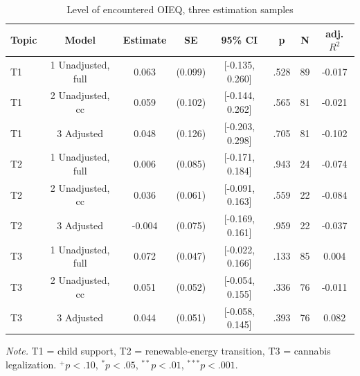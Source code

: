 \begin{table}[htbp]
\centering
\begin{threeparttable}
\caption{Level of encountered OIEQ, three estimation samples}
\label{tab:tab_q_level}
\begin{tabular}{lccccccc}
\toprule
  Topic & Model & Estimate & SE & 95\% CI & p & N & adj. $R^2$ \\
\midrule
  T1 & 1 Unadjusted, full & 0.063 & (0.099) & [-0.135, 0.260] & .528 & 89 & -0.017 \\
  T1 & 2 Unadjusted, cc & 0.059 & (0.102) & [-0.144, 0.262] & .565 & 81 & -0.021 \\
  T1 & 3 Adjusted & 0.048 & (0.126) & [-0.203, 0.298] & .705 & 81 & -0.102 \\
  T2 & 1 Unadjusted, full & 0.006 & (0.085) & [-0.171, 0.184] & .943 & 24 & -0.074 \\
  T2 & 2 Unadjusted, cc & 0.036 & (0.061) & [-0.091, 0.163] & .559 & 22 & -0.084 \\
  T2 & 3 Adjusted & -0.004 & (0.075) & [-0.169, 0.161] & .959 & 22 & -0.037 \\
  T3 & 1 Unadjusted, full & 0.072 & (0.047) & [-0.022, 0.166] & .133 & 85 & 0.004 \\
  T3 & 2 Unadjusted, cc & 0.051 & (0.052) & [-0.054, 0.155] & .336 & 76 & -0.011 \\
  T3 & 3 Adjusted & 0.044 & (0.051) & [-0.058, 0.145] & .393 & 76 & 0.082 \\
\bottomrule
\end{tabular}
\begin{tablenotes}\footnotesize\item \textit{Note.} T1 = child support, T2 = renewable-energy transition, T3 = cannabis legalization. $^{+}p<.10$, $^{*}p<.05$, $^{**}p<.01$, $^{***}p<.001$.\end{tablenotes}
\end{threeparttable}
\end{table}
